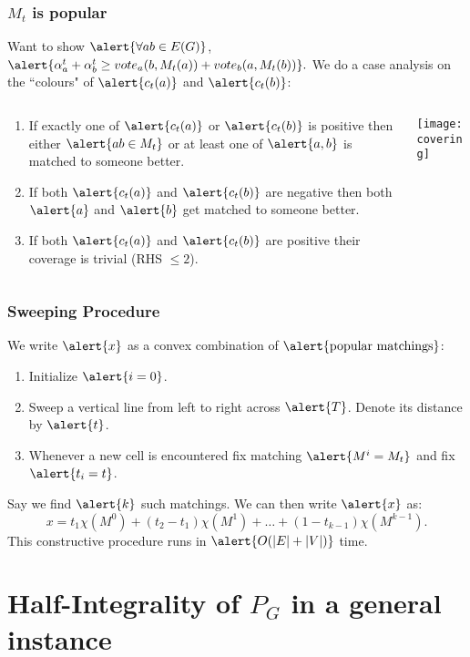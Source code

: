 \documentclass[10pt]{beamer}
\begin{document}
\begin{frame}
\frametitle{$M_t$ is popular}
Want to show $\alert{\forall ab \in E(G)}$, $\alert{\alpha^t_a + \alpha^t_b \geq vote_a(b,M_t(a)) + vote_b(a, M_t(b))}.$
We do a case analysis on the ``colours" of $\alert{c_t(a)}$ and $\alert{c_t(b)}$:
\begin{columns}[T] %
\begin{column}{.48\textwidth}
\begin{enumerate}
\item If exactly one of $\alert{c_t(a)}$ or $\alert{c_t(b)}$ is positive then either $\alert{ab \in M_t}$ or at least one of $\alert{a,b}$ is matched to someone better.
\item If both $\alert{c_t(a)}$ and $\alert{c_t(b)}$ are negative then both $\alert{a}$ and $\alert{b}$ get matched to someone better.
\item If both $\alert{c_t(a)}$ and $\alert{c_t(b)}$ are positive their coverage is trivial (RHS $\leq 2$).
\end{enumerate}
\end{column}
\begin{column}{.48\textwidth}
\texttt{[image: covering]}
\end{column}
\end{columns}
\end{frame}

\begin{frame}
\frametitle{Sweeping Procedure}
We write $\alert{x}$ as a convex combination of $\text{\alert{popular matchings}}$:
\begin{enumerate}
\item Initialize $\alert{i=0}$.
\item Sweep a vertical line from left to right across $\alert{T}$. Denote its distance by $\alert{t}$. 
\item Whenever a new cell is encountered fix matching $\alert{M^i = M_t}$ and fix $\alert{t_i = t}$. 
\end{enumerate}
Say we find $\alert{k}$ such matchings. We can then write $\alert{x}$ as:
$$x = t_1\chi(M^0) + (t_2 - t_1)\chi(M^1) + \dots + (1 - t_{k-1}) \chi(M^{k-1}).$$
This constructive procedure runs in $\alert{O(|E| + |V|)}$ time.
\end{frame}
\section{Half-Integrality of $P_G$ in a general instance}
\end{document}
